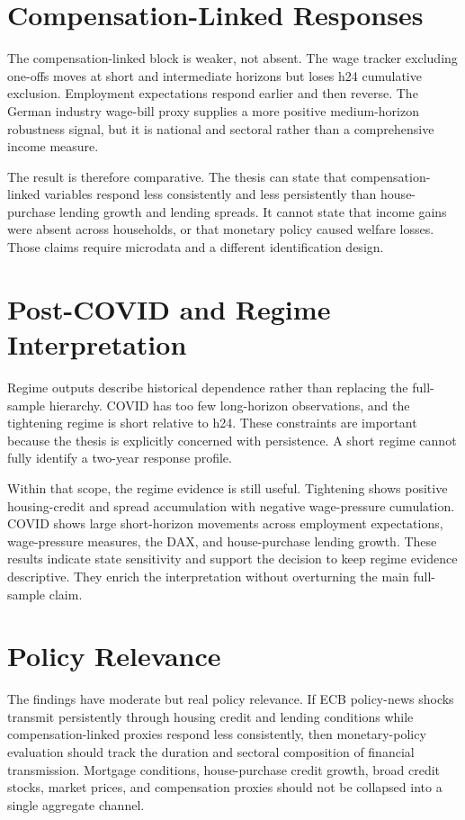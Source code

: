 \section{Compensation-Linked Responses}

The compensation-linked block is weaker, not absent. The wage tracker excluding one-offs moves at short and intermediate horizons but loses h24 cumulative exclusion. Employment expectations respond earlier and then reverse. The German industry wage-bill proxy supplies a more positive medium-horizon robustness signal, but it is national and sectoral rather than a comprehensive income measure.

The result is therefore comparative. The thesis can state that compensation-linked variables respond less consistently and less persistently than house-purchase lending growth and lending spreads. It cannot state that income gains were absent across households, or that monetary policy caused welfare losses. Those claims require microdata and a different identification design.

\section{Post-COVID and Regime Interpretation}

Regime outputs describe historical dependence rather than replacing the full-sample hierarchy. COVID has too few long-horizon observations, and the tightening regime is short relative to h24. These constraints are important because the thesis is explicitly concerned with persistence. A short regime cannot fully identify a two-year response profile.

Within that scope, the regime evidence is still useful. Tightening shows positive housing-credit and spread accumulation with negative wage-pressure cumulation. COVID shows large short-horizon movements across employment expectations, wage-pressure measures, the DAX, and house-purchase lending growth. These results indicate state sensitivity and support the decision to keep regime evidence descriptive. They enrich the interpretation without overturning the main full-sample claim.

\section{Policy Relevance}

The findings have moderate but real policy relevance. If ECB policy-news shocks transmit persistently through housing credit and lending conditions while compensation-linked proxies respond less consistently, then monetary-policy evaluation should track the duration and sectoral composition of financial transmission. Mortgage conditions, house-purchase credit growth, broad credit stocks, market prices, and compensation proxies should not be collapsed into a single aggregate channel.

